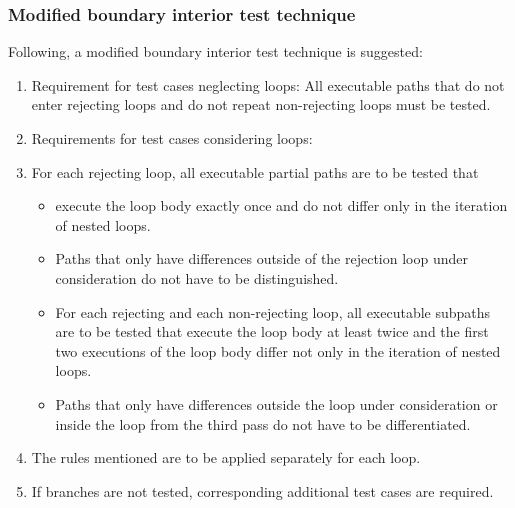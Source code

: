 \documentclass[master,english,smartquotes,apa]{hgbthesis}
\newcommand{\TODO}[1]{\textcolor{red}{\textbf{ToDo:} #1}}
\begin{document}


	\subsubsection{Modified boundary interior test technique}

	Following, a modified boundary interior test technique is suggested:

	\begin{enumerate}
		\item Requirement for test cases neglecting loops: All executable paths that do not enter rejecting loops and do not repeat non-rejecting loops must be tested.
		\item Requirements for test cases considering loops:
		\item For each rejecting loop, all executable partial paths are to be tested that
			\begin{itemize}
				\item execute the loop body exactly once and do not differ only in the iteration of nested loops.
				\item Paths that only have differences outside of the rejection loop under consideration do not have to be distinguished.
			\end{itemize}
			\begin{itemize}
				\item For each rejecting and each non-rejecting loop, all executable subpaths are to be tested that execute the loop body at least twice and the first two executions of the loop body differ not only in the iteration of nested loops.
				\item Paths that only have differences outside the loop under consideration or inside the loop from the third pass do not have to be differentiated.
			\end{itemize}
		\item The rules mentioned are to be applied separately for each loop.
		\item If branches are not tested, corresponding additional test cases are required.
	\end{enumerate}
\end{document}
